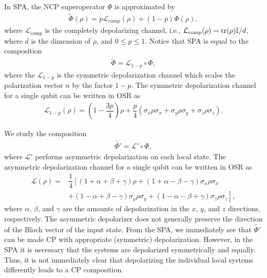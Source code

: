 \documentclass[12pt]{iopart}
\begin{document}
In SPA, the NCP superoperator $\Phi$ is approximated by
\begin{align}\label{phiMixtureMaxDep}
    \widetilde{\Phi}(\rho)=p\mathcal{L}_\text{comp}(\rho)+(1-p)\Phi(\rho),
\end{align}
where $\mathcal{L}_\text{comp}$ is the completely depolarizing channel, i.e., $\mathcal{L}_\text{comp}(\rho)=\tr(\rho)\mathbb{I}/d$, where $d$ is the dimension of $\rho$, and $0\leq p \leq 1$. Notice that SPA is equal to the composition
\begin{align}\label{eq:spaComp}
    \widetilde{\Phi}=\mathcal{L}_{1-p}\circ\Phi,
\end{align}
where the $\mathcal{L}_{1-p}$ is the symmetric depolarization channel which scales the polarization vector $n$ \cite{Mahler:book,Jakob:01,Byrd/Khaneja:03,Kimura} 
by the factor $1-p$. The symmetric depolarization channel for a single qubit can be written in OSR as
\begin{align}
    \mathcal{L}_{1-p}(\rho)=\left(1-\dfrac{3p}{4}\right)\rho+\dfrac{p}{4}(\sigma_x\rho\sigma_x+\sigma_y\rho\sigma_y+\sigma_z\rho\sigma_z).
\end{align}

We study the composition
\begin{align}\label{eq:asymComp}
    \widetilde{\Phi'}=\mathcal{L}'\circ\Phi,
\end{align}
where $\mathcal{L}'$ performs asymmetric depolarization on each local state.  The asymmetric depolarization channel for a single qubit can be written in OSR as
\begin{align}
    \label{Eq:OSR_of_ADM}\mathcal{L}(\rho)=&\dfrac{1}{4}\left[(1+\alpha+\beta+\gamma)\rho+(1+\alpha-\beta-\gamma)\sigma_x\rho\sigma_x\right.\\
    &\left.+(1-\alpha+\beta-\gamma)\sigma_y\rho\sigma_y+(1-\alpha-\beta+\gamma)\sigma_z\rho\sigma_z\right],
\end{align}
where $\alpha$, $\beta$, and $\gamma$ are the amounts of depolarization in the $x$, $y$, and $z$ directions, respectively. The asymmetric depolarizer does not generally preserve the direction of the Bloch vector of the input state. From the SPA, we immediately see that $\widetilde{\Phi'}$ can be made CP with appropriate (symmetric) depolarization. However, in the SPA it is necessary that the systems are depolarized symmetrically and equally. Thus, it is not immediately clear that depolarizing the individual local systems differently leads to a CP composition. 
\end{document}
